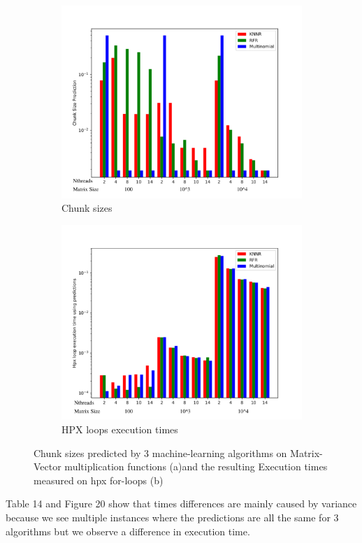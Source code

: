 \begin{figure}[h]
	\centering
	\begin{subfigure}[b]{0.5\textwidth}
		\centering
		\includegraphics[width=\textwidth]{images/bars_Vector_cs.pdf}
		\caption[Network2]%
		{{Chunk sizes}}    
	\end{subfigure}
	\hfill
	\begin{subfigure}[b]{0.49\textwidth}  
		\centering 
		\includegraphics[width=\textwidth]{images/bars_vector_times.pdf}
		\caption[]%
		{{HPX loops execution times}}    
	\end{subfigure}
	\caption{Chunk sizes predicted by 3 machine-learning algorithms on Matrix-Vector multiplication functions (a)and the resulting Execution times measured on hpx for-loops (b)} 
\end{figure}
Table 14 and Figure 20 show that times differences are mainly caused by variance because we see multiple instances where the predictions are all the same for 3 algorithms but we observe a difference in execution time.

